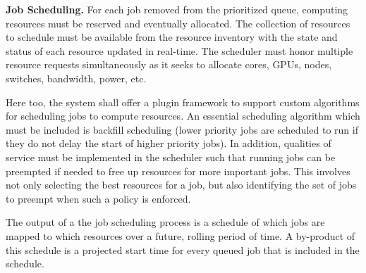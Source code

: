 \textbf{Job Scheduling.} For each job removed from the prioritized
queue, computing resources must be reserved and eventually allocated.
The collection of resources to schedule must be available from the
resource inventory with the state and status of each resource updated
in real-time.  The scheduler must honor multiple resource requests
simultaneously as it seeks to allocate cores, GPUs, nodes, switches,
bandwidth, power, etc.

Here too, the system shall offer a plugin framework to support custom
algorithms for scheduling jobs to compute resources.  An essential
scheduling algorithm which must be included is backfill scheduling
(lower priority jobs are scheduled to run if they do not delay the
start of higher priority jobs).  In addition, qualities of service must
be implemented in the scheduler such that running jobs can be
preempted if needed to free up resources for more important jobs.
This involves not only selecting the best resources for a job, but
also identifying the set of jobs to preempt when such a policy is
enforced.

The output of a the job scheduling process is a schedule of which jobs
are mapped to which resources over a future, rolling period of time.
A by-product of this schedule is a projected start time for every
queued job that is included in the schedule.




